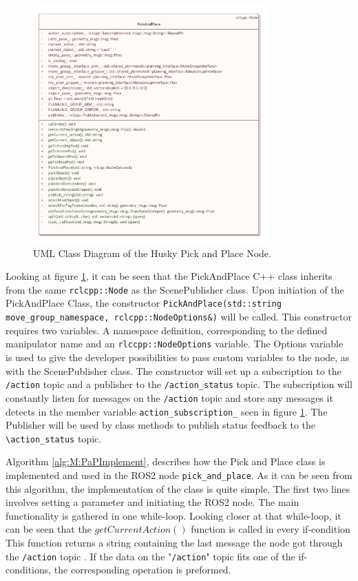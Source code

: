 \begin{figure}[htp]
  \centering
  \includegraphics[width = 0.8\textwidth]{Figures/husky_pick_and_place.pdf}
  \caption{UML Class Diagram of the Husky Pick and Place Node.}
  \label{fig:PickAndPlaceUML}
\end{figure}

Looking at figure \ref{fig:PickAndPlaceUML}, it can be seen that the PickAndPlace C++ class inherits from the same \lstinline{rclcpp::Node} as the ScenePublisher class. Upon initiation of the PickAndPlace Class, the constructor \lstinline{PickAndPlace(std::string move_group_namespace, rclcpp::NodeOptions&)} will be called. This constructor requires two variables. A namespace definition, corresponding to the defined manipulator name and an \lstinline{rlccpp::NodeOptions} variable. The Options variable is used to give the developer possibilities to pass custom variables to the node, as with the ScenePublisher class.
The constructor will set up a subscription to the \lstinline{/action} topic and a publisher to the \lstinline{/action_status} topic. The subscription will constantly listen for messages on the \lstinline{/action} topic and store any messages it detects in the member variable \lstinline{action_subscription_} seen in figure \ref{fig:PickAndPlaceUML}. The Publisher will be used by class methods to publish status feedback to the \lstinline{\action_status} topic.

Algorithm \ref{alg:M:PaPImplement}, describes how the Pick and Place class is implemented and used in the ROS2 node \lstinline{pick_and_place}. As it can be seen from this algorithm, the implementation of the class is quite simple. The first two lines involves setting a parameter and initiating the ROS2 node. The main functionality is gathered in one while-loop. Looking closer at that while-loop, it can be seen that the $getCurrentAction()$ function is called in every if-condition This function  returns a string containing the last message the node got through the \lstinline{/action} topic . If the data on the "\lstinline{/action}" topic fits one of the if-conditions, the corresponding operation is preformed.

